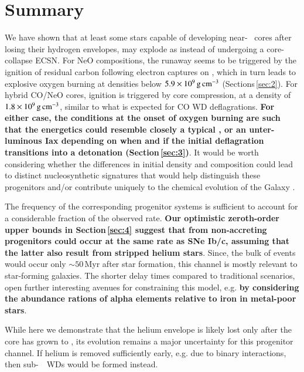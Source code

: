 \documentclass[twocolumn]{aa}
\begin{document}
\section{Summary}\label{sec:5}
We have shown that at least some stars capable of developing near-\mch~ \one cores 
after losing their hydrogen  envelopes, may explode as \ias instead of 
undergoing a core-collapse  ECSN. For NeO compositions, the runaway seems to be triggered by the ignition of 
residual carbon following electron captures on , which in turn 
leads to explosive oxygen burning at densities below $5.9\times 10^{9}\mathrm{\,g\,cm^{-3}}$ (Sections\,\ref{sec:2}). 
For hybrid CO/NeO cores, ignition is triggered by core compression, at a density of $1.8\times10^{9}\mathrm{\,g\,cm^{-3}}$, similar to what is expected for CO WD deflagrations. {\bf For either case, the conditions at the onset of oxygen burning are such that the energetics  could resemble closely a typical \ia, or an unter-luminous Iax depending on when and if the initial deflagration transitions into a detonation (Section\,\ref{sec:3})}. 
It would be worth considering whether the differences in initial density and 
composition could lead to distinct nucleosynthetic signatures that would help 
distinguish these progenitors and/or contribute uniquely to the chemical 
evolution of the Galaxy \citep[in analogy to ][for ECSNe]{Jones:2018ule}.



The frequency of the corresponding progenitor systems 
is sufficient to account for a considerable fraction of the observed \ia  rate. {\bf Our optimistic zeroth-order upper bounds in  Section\,\ref{sec:4} suggest that \ias from non-accreting progenitors could occur at the same rate as SNe Ib/c, assuming that the latter also result from stripped helium stars}. Since, the bulk of events would occur only $\sim 50$\,Myr after star formation, this channel is mostly relevant to star-forming galaxies. The shorter delay times compared to traditional \ia scenarios, open further interesting avenues for constraining this model, e.g. {\bf by considering the abundance rations of alpha elements relative to iron in metal-poor stars}. 

 While here we demonstrate that the helium envelope is  likely lost only  after the core has grown to \mch, its evolution remains a major uncertainty for this progenitor channel. If helium is removed sufficiently early, e.g. due to binary interactions, then sub-\mch~\one\ WDs would be formed instead. 
 
\end{document}
